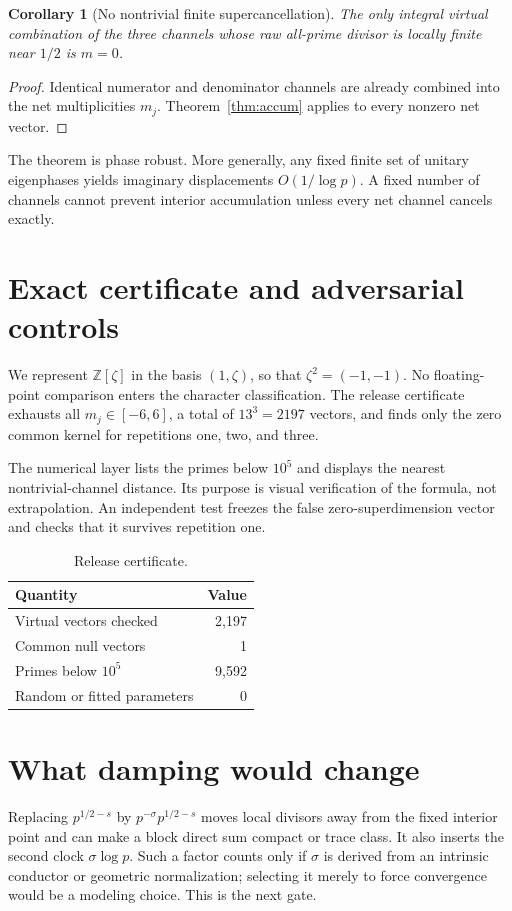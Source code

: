 \documentclass[11pt]{article}
\newtheorem{corollary}[theorem]{Corollary}
\theoremstyle{remark}\newtheorem{remark}[theorem]{Remark}
\begin{document}
\begin{corollary}[No nontrivial finite supercancellation]
The only integral virtual combination of the three channels whose raw
all-prime divisor is locally finite near \(1/2\) is \(m=0\).
\end{corollary}
\begin{proof}
Identical numerator and denominator channels are already combined into the
net multiplicities \(m_j\).  Theorem~\ref{thm:accum} applies to every
nonzero net vector.
\end{proof}

The theorem is phase robust.  More generally, any fixed finite set of
unitary eigenphases yields imaginary displacements \(O(1/\log p)\).  A fixed
number of channels cannot prevent interior accumulation unless every net
channel cancels exactly.

\section{Exact certificate and adversarial controls}
We represent \(\mathbb Z[\zeta]\) in the basis \((1,\zeta)\), so that
\(\zeta^2=(-1,-1)\).  No floating-point comparison enters the character
classification.  The release certificate exhausts all
\(m_j\in[-6,6]\), a total of \(13^3=2197\) vectors, and finds only the zero
common kernel for repetitions one, two, and three.

The numerical layer lists the primes below \(10^5\) and displays the nearest
nontrivial-channel distance.  Its purpose is visual verification of the
formula, not extrapolation.  An independent test freezes the false
zero-superdimension vector and checks that it survives repetition one.

\begin{table}[h]
\centering
\caption{Release certificate.}
\begin{tabular}{lr}
\toprule
Quantity & Value\\\midrule
Virtual vectors checked & 2,197\\
Common null vectors & 1\\
Primes below \(10^5\) & 9,592\\
Random or fitted parameters & 0\\
\bottomrule
\end{tabular}
\end{table}

\section{What damping would change}
Replacing \(p^{1/2-s}\) by \(p^{-\sigma}p^{1/2-s}\) moves local divisors
away from the fixed interior point and can make a block direct sum compact
or trace class.  It also inserts the second clock \(\sigma\log p\).  Such a
factor counts only if \(\sigma\) is derived from an intrinsic conductor or
geometric normalization; selecting it merely to force convergence would be
a modeling choice.  This is the next gate.
\end{document}
